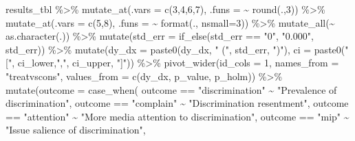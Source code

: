 \documentclass[
  13pt,
  a4paper,
]{article}
\newenvironment{Shaded}{\begin{snugshade}}{\end{snugshade}}
\newcommand{\AttributeTok}[1]{\textcolor[rgb]{0.77,0.63,0.00}{#1}}
\newcommand{\DecValTok}[1]{\textcolor[rgb]{0.00,0.00,0.81}{#1}}
\newcommand{\FunctionTok}[1]{\textcolor[rgb]{0.00,0.00,0.00}{#1}}
\newcommand{\NormalTok}[1]{#1}
\newcommand{\SpecialCharTok}[1]{\textcolor[rgb]{0.00,0.00,0.00}{#1}}
\newcommand{\StringTok}[1]{\textcolor[rgb]{0.31,0.60,0.02}{#1}}
\begin{document}
\begin{Shaded}
\begin{Highlighting}[]
\NormalTok{results\_tbl }\SpecialCharTok{\%\textgreater{}\%} 
  \FunctionTok{mutate\_at}\NormalTok{(}\AttributeTok{.vars =} \FunctionTok{c}\NormalTok{(}\DecValTok{3}\NormalTok{,}\DecValTok{4}\NormalTok{,}\DecValTok{6}\NormalTok{,}\DecValTok{7}\NormalTok{), }\AttributeTok{.funs =} \SpecialCharTok{\textasciitilde{}} \FunctionTok{round}\NormalTok{(.,}\DecValTok{3}\NormalTok{)) }\SpecialCharTok{\%\textgreater{}\%} 
  \FunctionTok{mutate\_at}\NormalTok{(}\AttributeTok{.vars =} \FunctionTok{c}\NormalTok{(}\DecValTok{5}\NormalTok{,}\DecValTok{8}\NormalTok{), }\AttributeTok{.funs =} \SpecialCharTok{\textasciitilde{}} \FunctionTok{format}\NormalTok{(., }\AttributeTok{nsmall=}\DecValTok{3}\NormalTok{)) }\SpecialCharTok{\%\textgreater{}\%} 
  \FunctionTok{mutate\_all}\NormalTok{(}\SpecialCharTok{\textasciitilde{}} \FunctionTok{as.character}\NormalTok{(.)) }\SpecialCharTok{\%\textgreater{}\%} 
  \FunctionTok{mutate}\NormalTok{(}\AttributeTok{std\_err =} \FunctionTok{if\_else}\NormalTok{(std\_err }\SpecialCharTok{==} \StringTok{"0"}\NormalTok{, }\StringTok{"0.000"}\NormalTok{, std\_err)) }\SpecialCharTok{\%\textgreater{}\%} 
  \FunctionTok{mutate}\NormalTok{(}\AttributeTok{dy\_dx =} \FunctionTok{paste0}\NormalTok{(dy\_dx, }\StringTok{" ("}\NormalTok{, std\_err, }\StringTok{")"}\NormalTok{),}
         \AttributeTok{ci =} \FunctionTok{paste0}\NormalTok{(}\StringTok{"["}\NormalTok{, ci\_lower,}\StringTok{","}\NormalTok{, ci\_upper, }\StringTok{"]"}\NormalTok{)) }\SpecialCharTok{\%\textgreater{}\%} 
  \FunctionTok{pivot\_wider}\NormalTok{(}\AttributeTok{id\_cols =} \DecValTok{1}\NormalTok{,}
              \AttributeTok{names\_from =} \StringTok{"treatvscons"}\NormalTok{,}
              \AttributeTok{values\_from =} \FunctionTok{c}\NormalTok{(dy\_dx, p\_value,}
\NormalTok{                              p\_holm)) }\SpecialCharTok{\%\textgreater{}\%} 
  \FunctionTok{mutate}\NormalTok{(}\AttributeTok{outcome =} \FunctionTok{case\_when}\NormalTok{(}
\NormalTok{    outcome }\SpecialCharTok{==} \StringTok{"discrimination"} \SpecialCharTok{\textasciitilde{}} \StringTok{"Prevalence of discrimination"}\NormalTok{,}
\NormalTok{    outcome }\SpecialCharTok{==} \StringTok{"complain"} \SpecialCharTok{\textasciitilde{}} \StringTok{"Discrimination resentment"}\NormalTok{,}
\NormalTok{    outcome }\SpecialCharTok{==} \StringTok{"attention"} \SpecialCharTok{\textasciitilde{}} \StringTok{"More media attention to discrimination"}\NormalTok{,}
\NormalTok{    outcome }\SpecialCharTok{==} \StringTok{"mip"} \SpecialCharTok{\textasciitilde{}} \StringTok{"Issue salience of discrimination"}\NormalTok{,}

\end{Highlighting}
\end{Shaded}
\end{document}
